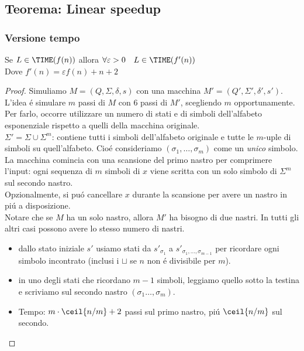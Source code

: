 
\subsection{Teorema: Linear speedup}
\subsubsection{Versione tempo}
Se $L \in \TIME(f(n))$ allora $\forall \varepsilon > 0 \quad L \in \TIME(f'(n))$ \\
Dove $f'(n) = \varepsilon f(n) + n + 2$
\begin{proof}
Simuliamo $M=(Q, \Sigma, \delta, s)$ con una macchina $M'=(Q', \Sigma', \delta', s')$. \\
L'idea é simulare $m$ passi di $M$ con $6$ passi di $M'$, scegliendo $m$ opportunamente. \\
Per farlo, occorre utilizzare un numero di stati e di simboli dell'alfabeto esponenziale rispetto a quelli della macchina originale. \\ 
$\Sigma' = \Sigma \cup \Sigma^m$: contiene tutti i simboli dell'alfabeto originale e tutte le $m$-uple di simboli su quell'alfabeto.
Cioé consideriamo $(\sigma_1, \ldots, \sigma_m)$ come un \textit{unico} simbolo. \\

La macchina comincia con una scansione del primo nastro per comprimere l'input: ogni sequenza di $m$ simboli di $x$ viene scritta con un solo simbolo di $\Sigma^m$ sul secondo nastro.\\
Opzionalmente, si puó cancellare $x$ durante la scansione per avere un nastro in piú a disposizione. \\
Notare che se $M$ ha un solo nastro, allora $M'$ ha bisogno di due nastri. In tutti gli altri casi possono avere lo stesso numero di nastri. \\
\begin{itemize}
    \item dallo stato iniziale $s'$ usiamo stati da ${s'}_{\sigma_1}$ a ${s'}_{\sigma_1, \ldots, \sigma_{m-1}}$ per ricordare ogni simbolo incontrato (inclusi i $\sqcup$ se $n$ non é divisibile per $m$).
    \item in uno degli stati che ricordano $m-1$ simboli, leggiamo quello sotto la testina e scriviamo sul secondo nastro $(\sigma_1 \ldots, \sigma_m)$.
    \item Tempo: $m \cdot \ceil{n/m} + 2$  passi sul primo nastro, piú $\ceil{n/m}$ sul secondo.
\end{itemize}


\end{proof}
